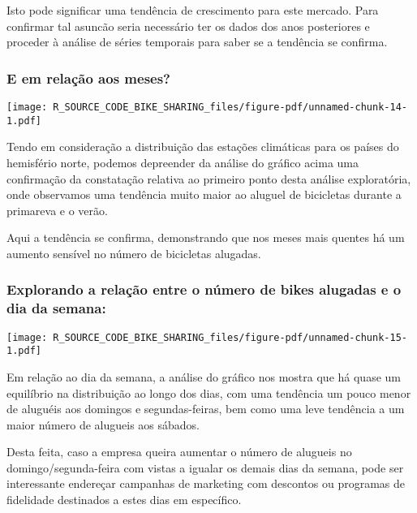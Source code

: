 \documentclass[
  letterpaper,
  DIV=11,
  numbers=noendperiod]{scrartcl}
\begin{document}
Isto pode significar uma tendência de crescimento para este mercado.
Para confirmar tal asuncão seria necessário ter os dados dos anos
posteriores e proceder à análise de séries temporais para saber se a
tendência se confirma.

\subsubsection{E em relação aos
meses?}\label{e-em-relauxe7uxe3o-aos-meses}

\begin{center}
\texttt{[image: R\_SOURCE\_CODE\_BIKE\_SHARING\_files/figure-pdf/unnamed-chunk-14-1.pdf]}
\end{center}

Tendo em consideração a distribuição das estações climáticas para os
países do hemisfério norte, podemos depreender da análise do gráfico
acima uma confirmação da constatação relativa ao primeiro ponto desta
análise exploratória, onde observamos uma tendência muito maior ao
aluguel de bicicletas durante a primareva e o verão.

Aqui a tendência se confirma, demonstrando que nos meses mais quentes há
um aumento sensível no número de bicicletas alugadas.

\subsubsection{Explorando a relação entre o número de bikes alugadas e o
dia da
semana:}\label{explorando-a-relauxe7uxe3o-entre-o-nuxfamero-de-bikes-alugadas-e-o-dia-da-semana}

\begin{center}
\texttt{[image: R\_SOURCE\_CODE\_BIKE\_SHARING\_files/figure-pdf/unnamed-chunk-15-1.pdf]}
\end{center}

\newpage{}

Em relação ao dia da semana, a análise do gráfico nos mostra que há
quase um equilíbrio na distribuição ao longo dos dias, com uma tendência
um pouco menor de aluguéis aos domingos e segundas-feiras, bem como uma
leve tendência a um maior número de alugueis aos sábados.

Desta feita, caso a empresa queira aumentar o número de alugueis no
domingo/segunda-feira com vistas a igualar os demais dias da semana,
pode ser interessante endereçar campanhas de marketing com descontos ou
programas de fidelidade destinados a estes dias em específico.
\end{document}
